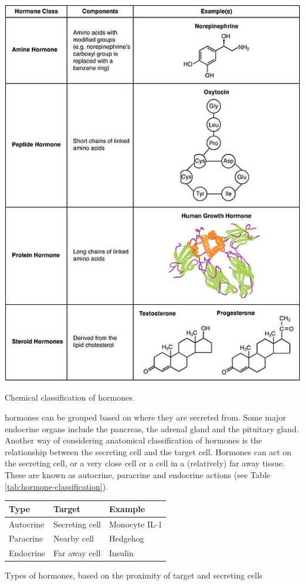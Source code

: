 \documentclass{tufte-handout}
\begin{document}
\begin{marginfigure}
  \includegraphics{figures/hormone-classification}
  \caption{Chemical classification of hormones.}
    \label{fig:chemical-classification}
\end{marginfigure}

 hormones can be grouped based on where they are secreted from.  Some major endocrine organs include the pancreas, the adrenal gland and the pituitary gland.  Another way of considering anatomical classification of hormones is the relationship between the secreting cell and the target cell.  Hormones can act on the secreting cell, or a very close cell or a cell in a (relatively) far away tissue.  These are known as autocrine, paracrine and endocrine actions (see Table \ref{tab:hormone-classification}).

\begin{margintable}
  \centering
  \begin{tabular}{lll}
    \toprule
    Type & Target & Example \\
    \midrule
    Autocrine & Secreting cell & Monocyte IL-1\\
    Paracrine & Nearby cell & Hedgehog \\
    Endocrine & Far away cell & Insulin \\
    \bottomrule
  \end{tabular}
  \caption{Types of hormones, based on the proximity of target and secreting cells}
  \label{tab:hormone-classification}
\end{margintable}
\end{document}
